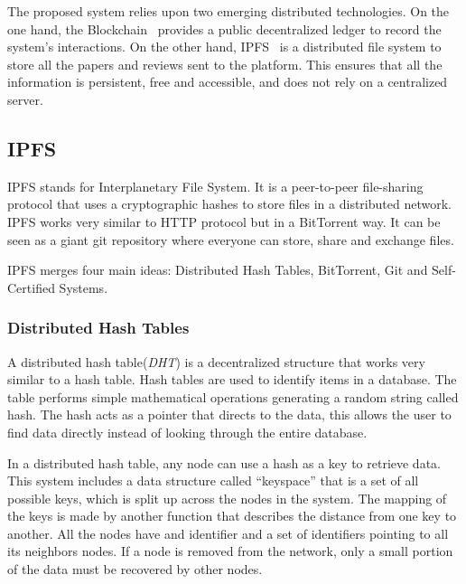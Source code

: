 The proposed system relies upon two emerging distributed technologies. On the
one hand, the Blockchain~\cite{buterin2014ethereum} provides a public
decentralized ledger to record the system's interactions. On the other hand,
IPFS~\cite{benet_ipfs-content_2014} is a distributed file system to store all
the papers and reviews sent to the platform. This ensures that all the
information is persistent, free and accessible, and does not rely on a
centralized server.

\subsection{IPFS}
\label{tech:sec:ipfs}
IPFS stands for Interplanetary File System. It is a peer-to-peer file-sharing
protocol that uses a cryptographic hashes to store files in a distributed
network. IPFS works very similar to HTTP protocol but in a BitTorrent way. It
can be seen as a giant git repository where everyone can store, share and
exchange files\cite{benet2014ipfs}.

IPFS merges four main ideas: Distributed Hash Tables, BitTorrent, Git and
Self-Certified Systems.

\subsubsection*{Distributed Hash Tables}
\label{tech:sec:ipfs:dht}
A distributed hash table(\emph{DHT}) is a decentralized structure that works
very similar to a hash table. Hash tables are used to identify items in a
database. The table performs simple mathematical operations generating a random
string called hash. The hash acts as a pointer that directs to the data, this
allows the user to find data directly instead of looking through the entire
database\cite{kaluszka2010distributed}.

In a distributed hash table, any node can use a hash as a key to retrieve data.
This system includes a data structure called ``keyspace'' that is a set of all
possible keys, which is split up across the nodes in the system. The mapping of
the keys is made by another function that describes the distance from one key to
another. All the nodes have and identifier and a set of identifiers pointing to
all its neighbors nodes. If a node is removed from the network, only a small
portion of the data must be recovered by other
nodes\cite{kaluszka2010distributed}.

